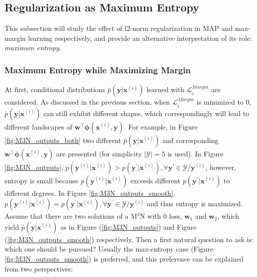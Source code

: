 \subsection{Regularization as Maximum Entropy}
This subsection will study the effect of l2-norm 
regularization in MAP and max-margin learning respectively, and provide an alternative interpretation of its role: \emph{maximum entropy}.

\subsubsection{Maximum Entropy while Maximizing Margin}
At first, conditional distributions $\bar p(\mathbf{y}|\mathbf{x}^{(i)})$ learned 
with $\mathcal{L}_i^{Margin}$ are considered. As discussed in the previous section, when $\mathcal{L}_i^{Margin}$ is minimized to 0,       
$\bar p(\mathbf{y}|\mathbf{x}^{(i)})$ can still exhibit different shapes, which correspondingly will lead to different landscapes of 
$\mathbf{w}^\top\boldsymbol{\phi}(\mathbf{x}^{(i)},\mathbf{y})$. For example, in Figure \ref{fig:M3N_outputs_both} two different $\bar p(\mathbf{y}|\mathbf{x}^{(i)})$ and 
corresponding  $\mathbf{w}^\top\boldsymbol{\phi}(\mathbf{x}^{(i)},\mathbf{y})$ are presented (for simplicity $|\mathcal{Y}|=5$ is used).                
In Figure \ref{fig:M3N_outputs}, $p(\mathbf{y}^{(i)}|\mathbf{x}^{(i)})>p(\mathbf{y}^{\prime}|\mathbf{x}^{(i)}),\forall \mathbf{y}^\prime\in \mathcal{Y}/\mathbf{y}^{(i)}$, however, entropy 
is small because $p(\mathbf{y}^{(i)}|\mathbf{x}^{(i)})$ exceeds different $p(\mathbf{y}^{\prime}|\mathbf{x}^{(i)})$ to different degrees. In Figure \ref{fig:M3N_outputs_smooth},    
$p(\mathbf{y}^{(i)}|\mathbf{x}^{(i)})=p(\mathbf{y}^{\prime}|\mathbf{x}^{(i)}),\forall \mathbf{y}^\prime\in \mathcal{Y}/\mathbf{y}^{(i)}$ and thus entropy is maximized.     
Assume that there are two solutions of a M$^3$N with 0 loss, $\mathbf{w}_1$ and $\mathbf{w}_2$, which yield $\bar p(\mathbf{y}|\mathbf{x}^{(i)})$ as in Figure (\ref{fig:M3N_outputs}) and 
Figure (\ref{fig:M3N_outputs_smooth}) respectively. Then a first natural question to ask is: which one should be pursued?    
Usually the max-entropy case (Figure \ref{fig:M3N_outputs_smooth}) is preferred, and this preference can be explained from two perspectives: 
